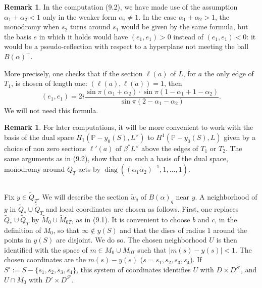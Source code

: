 \documentclass[12pt,a4paper]{article}
\theoremstyle{plain}
\theoremstyle{definition}
\newtheorem{remark}[theorem]{Remark}
\theoremstyle{remark}
\DeclareMathOperator{\diag}{diag}
\begin{document}
\begin{remark}
\label{9.3}
In the computation (9.2), we have made use of the assumption $\alpha_1 + \alpha_2 < 1$ only in the weaker form $\alpha_i \neq 1$. In the case $\alpha_1 + \alpha_2 > 1$, the monodromy when $s_2$ turns around $s_1$ would be given by the same formula, but the basis $e$ in which it holds would have $(e_1, e_1) > 0$ instead of $(e_1, e_1) < 0$: it would be a pseudo-reflection with respect to a hyperplane not meeting the ball $B(\alpha)^+$.

More precisely, one checks that if the section $\ell(a)$ of $L$, for $a$ the only edge of $T_1$, is chosen of length one: $(\ell(a), \ell(a)) = 1$, then
\[
(e_1, e_1) = 2i \frac{\sin \pi(\alpha_1 + \alpha_2) \cdot \sin \pi(1 - \alpha_1 + 1 - \alpha_2)}{\sin \pi(2 - \alpha_1 - \alpha_2)}.
\]
We will not need this formula.
\end{remark}

\begin{remark}
\label{9.4}
For later computations, it will be more convenient to work with the basis of the dual space $H_1(\mathbb{P} - y_0(S), L^\vee)$ to $H^1(\mathbb{P} - y_0(S), L)$ given by a choice of non zero sections $\ell'(a)$ of $\beta^* L^\vee$ above the edges of $T_1$ or $T_2$. The same arguments as in (9.2), show that on such a basis of the dual space, monodromy around $Q_T$ acts by $\diag((\alpha_1 \alpha_2)^{-1}, 1, \ldots, 1)$.
\end{remark}

\subsection{}
\label{9.5}

Fix $y \in \widetilde{Q}_T$. We will describe the section $\widetilde{w}_q$ of $B(\alpha)_q$ near $y$. A neighborhood of $y$ in $\widetilde{Q}_* \cup \widetilde{Q}_T$ and local coordinates are chosen as follows. First, one replaces $\widetilde{Q}_* \cup \widetilde{Q}_T$ by $\widetilde{M}_0 \cup \widetilde{M}_{0T}$, as in (9.1). It is convenient to choose $b$ and $c$, in the definition of $M_0$, so that $\infty \notin y(S)$ and that the discs of radius $1$ around the points in $y(S)$ are disjoint. We do so. The chosen neighborhood $U$ is then identified with the space of $m \in M_0 \cup M_{0T}$ such that $|m(s) - y(s)| < 1$. The chosen coordinates are the $m(s) - y(s)$ ($s = s_1, s_2, s_3, s_4$). If $S' := S - \{s_1, s_2, s_3, s_4\}$, this system of coordinates identifies $U$ with $D \times D^{S'}$, and $U \cap M_0$ with $D' \times D^{S'}$.
\end{document}

